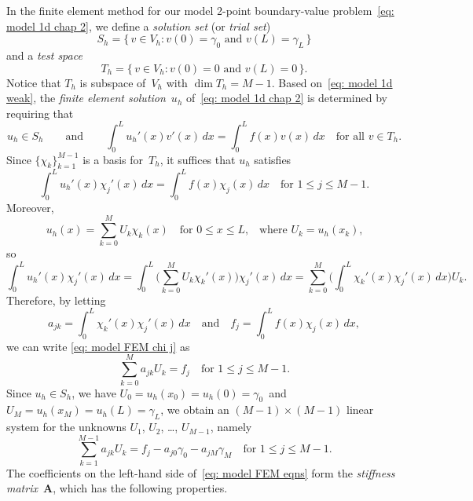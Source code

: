 In the finite element method for our model 2-point boundary-value 
problem~\eqref{eq: model 1d chap 2}, we define a \emph{solution set} (or
\emph{trial set})
\[
S_h=\{\,v\in V_h:\text{$v(0)=\gamma_0$ and $v(L)=\gamma_L$}\,\}
\]
and a \emph{test space}
\[
T_h=\{\,v\in V_h:\text{$v(0)=0$ and $v(L)=0$}\,\}.
\]
Notice that $T_h$ is subspace of~$V_h$ with $\dim T_h=M-1$.  Based 
on~\eqref{eq: model 1d weak}, the \emph{finite element solution}~$u_h$
of~\eqref{eq: model 1d chap 2} is determined by requiring that
\[
u_h\in S_h\qquad\text{and}\qquad
\int_0^L u_h'(x)v'(x)\,dx=\int_0^L f(x)v(x)\,dx \quad\text{for all $v\in T_h$.}
\]
Since $\{\chi_k\}_{k=1}^{M-1}$ is a basis for~$T_h$, it suffices that $u_h$ 
satisfies
\begin{equation}\label{eq: model FEM chi j}
\int_0^L u_h'(x)\chi_j'(x)\,dx=\int_0^L f(x)\chi_j(x)\,dx 
    \quad\text{for $1\le j\le M-1$.}
\end{equation}
Moreover, 
\begin{equation}\label{eq: uh U 1d}
u_h(x)=\sum_{k=0}^M U_k\chi_k(x)\quad\text{for $0\le x\le L$,}\quad
\text{where $U_k=u_h(x_k)$,}
\end{equation}
so
\[
\int_0^Lu_h'(x)\chi_j'(x)\,dx
    =\int_0^L\biggl(\sum_{k=0}^MU_k\chi_k'(x)\biggr)\chi_j'(x)\,dx
    =\sum_{k=0}^M\biggl(\int_0^L\chi_k'(x)\chi_j'(x)\,dx\biggr)U_k.
\]
Therefore, by letting
\[
a_{jk}=\int_0^L\chi_k'(x)\chi_j'(x)\,dx
\quad\text{and}\quad
f_j=\int_0^Lf(x)\chi_j(x)\,dx,
\]
we can write \eqref{eq: model FEM chi j} as
\[
\sum_{k=0}^M a_{jk}U_k=f_j\quad\text{for $1\le j\le M-1$.}
\]
Since $u_h\in S_h$, we have $U_0=u_h(x_0)=u_h(0)=\gamma_0$~and 
$U_M=u_h(x_M)=u_h(L)=\gamma_L$, we obtain an $(M-1)\times(M-1)$ linear system 
for the unknowns $U_1$, $U_2$, \dots, $U_{M-1}$, namely
\begin{equation}\label{eq: model FEM eqns}
\sum_{k=1}^{M-1}a_{jk}U_k=f_j-a_{j0}\gamma_0-a_{jM}\gamma_M
    \quad\text{for $1\le j\le M-1$.}
\end{equation}
The coefficients on the left-hand side of~\eqref{eq: model FEM eqns} form the
\emph{stiffness matrix}~$\boldsymbol{A}$, which has the following properties.

